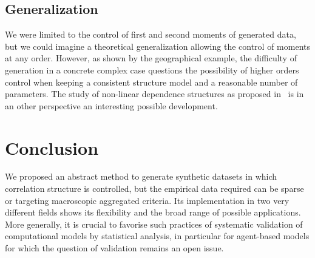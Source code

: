 \documentclass{bmcart}
\begin{document}


\subsection*{Generalization}

We were limited to the control of first and second moments of generated data, but we could imagine a theoretical generalization allowing the control of moments at any order. However, as shown by the geographical example, the difficulty of generation in a concrete complex case questions the possibility of higher orders control when keeping a consistent structure model and a reasonable number of parameters. The study of non-linear dependence structures as proposed in~\cite{chicheportiche2013nested} is in an other perspective an interesting possible development.






\section*{Conclusion}


We proposed an abstract method to generate synthetic datasets in which correlation structure is controlled, but the empirical data required can be sparse or targeting macroscopic aggregated criteria. Its implementation in two very different fields shows its flexibility and the broad range of possible applications. More generally, it is crucial to favorise such practices of systematic validation of computational models by statistical analysis, in particular for agent-based models for which the question of validation remains an open issue.
\end{document}
